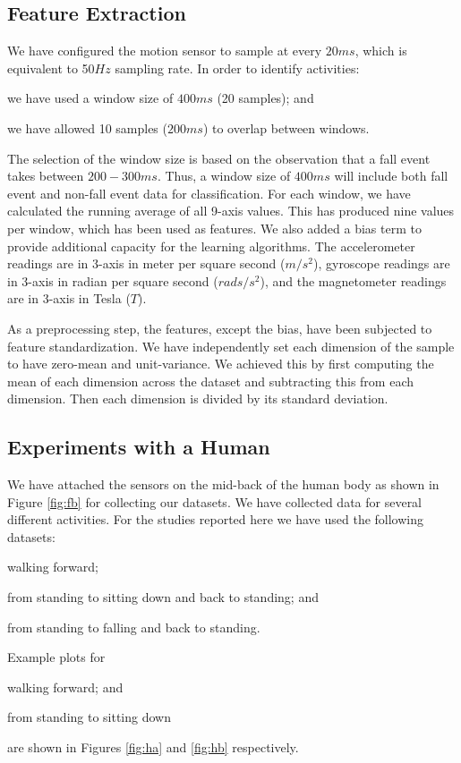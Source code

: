 \documentclass[letterpaper]{article}
\begin{document}
\begin{sloppy}
\subsection{Feature Extraction}

We  have configured the motion sensor to sample at every  $20ms$, which is equivalent to 50$Hz$ 
sampling rate. In order to 
identify activities: \begin{inparaenum}[1)] \item we have used a window size of $400ms$ (20 
samples); and \item we have allowed 10 samples ($200ms$) to overlap between windows. 
\end{inparaenum} The selection of the window size is based on the observation that a fall event 
takes between $200-300ms$. Thus, a window size of $400ms$ will include both fall event and 
non-fall event data for classification. For each window, we have calculated the running average of 
all 9-axis values. This has produced nine values per window, which has been used as features. We 
also added a bias term to provide additional capacity for the learning algorithms. The  
accelerometer readings are in 3-axis in meter per square second ($m/s^2$), gyroscope readings are 
in 3-axis in radian per square second ($rads/s^2$), and the magnetometer readings are in 3-axis in 
Tesla ($T$). 

As a preprocessing step, the features, except the bias, have been subjected to feature 
standardization. We have independently set each dimension of the sample  to have zero-mean and 
unit-variance. We achieved this by first computing the mean of each dimension across the dataset and 
subtracting this from each dimension. Then each dimension is divided by its standard deviation.
 

\subsection{Experiments with a Human}

We have attached the sensors on the mid-back of the human body as shown in Figure \ref{fig:fb} for  
collecting our datasets. We have collected data for several different  activities. For the studies 
reported here we have used the following datasets:
\begin{inparaenum}[(1)] \item walking forward; \item from standing to sitting down 
and back to standing; and \item from standing to falling and back to standing. \end{inparaenum} 
Example plots for \begin{inparaenum}[1)] \item walking forward; and \item from standing to sitting 
down  \end{inparaenum}  are shown in Figures \ref{fig:ha} and \ref{fig:hb} respectively. 



\end{sloppy}
\end{document}
